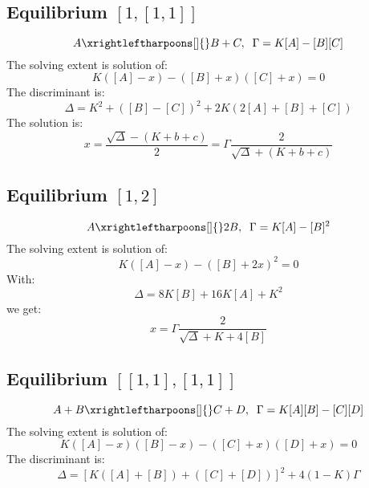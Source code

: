 \documentclass[aps,12pt]{revtex4}
\begin{document}
\subsection{Equilibrium $[1,[1,1]]$}
\begin{equation}
	A \xrightleftharpoons[]{} B+C, \;\; \Gamma = K[A] - [B][C]
\end{equation}
The solving extent is solution of:
\begin{equation}
	K([A]-x) - ([B]+x)([C]+x)= 0
\end{equation}
The discriminant is:
\begin{equation}
	\Delta = K^2 + ([B]-[C])^2 + 2K(2[A]+[B]+[C])
\end{equation}
The solution is:
\begin{equation}
	x = \dfrac{\sqrt{\Delta}-(K+b+c)}{2} = \Gamma \dfrac{2}{\sqrt{\Delta}+(K+b+c)}
\end{equation}

\subsection{Equilibrium $[1,2]$}
\begin{equation}
	A \xrightleftharpoons[]{} 2B, \;\; \Gamma = K[A] - [B]^2
\end{equation}
The solving extent is solution of:
\begin{equation}
 K([A]-x) - ([B]+2x)^2 = 0
\end{equation}
With:
\begin{equation}
\Delta = 8K[B]+16K[A]+K^2
\end{equation}
we get:
\begin{equation}
	x = \Gamma \dfrac{2}{\sqrt{\Delta} + K+4[B]}
\end{equation}


\subsection{Equilibrium $[ [1,1], [1,1]]$}
\begin{equation}
	A+B \xrightleftharpoons[]{} C+D, \;\; \Gamma = K[A][B] - [C][D]
\end{equation}
The solving extent is solution of:
\begin{equation}
	K([A]-x)([B]-x) - ([C]+x)([D]+x)= 0
\end{equation}
The discriminant is:
\begin{equation}
	\Delta = \left[K([A]+[B])+([C]+[D])\right]^2 + 4 (1-K) \Gamma
\end{equation}
\end{document}
